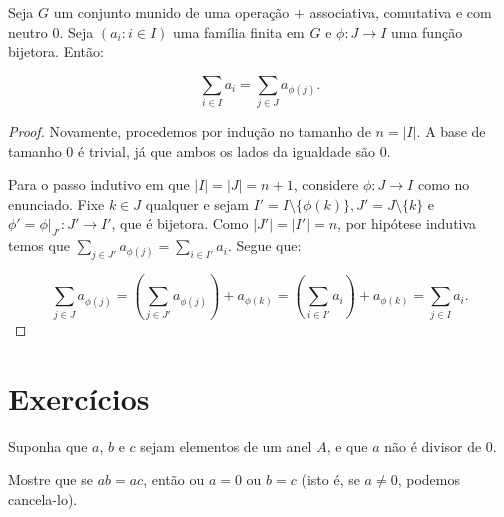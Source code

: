 \begin{prop}
    Seja $G$ um conjunto munido de uma operação $+$ associativa, comutativa e com neutro $0$.
Seja $(a_i: i \in I)$ uma família finita em $G$ e $\phi:J\rightarrow I$ uma função bijetora.
Então:

    \[\sum_{i \in I}a_i=\sum_{j \in J}a_{\phi(j)}.\]

\end{prop}
\begin{proof}
Novamente, procedemos por indução no tamanho de $n=|I|$.
A base de tamanho $0$ é trivial, já que ambos os lados da igualdade são $0$.

Para o passo indutivo em que $|I|=|J|=n+1$, considere $\phi:J\rightarrow I$ como no enunciado.
Fixe $k \in J$ qualquer e sejam $I'=I\setminus\{\phi(k)\}, J'=J\setminus\{k\}$ e $\phi'=\phi|_{J'}:J'\rightarrow I'$, que é bijetora.
Como $|J'|=|I'|=n$, por hipótese indutiva temos que $\sum_{j \in J'}a_{\phi(j)}=\sum_{i \in I'}a_i$.
Segue que:

\[\sum_{j \in J}a_{\phi(j)}=\left(\sum_{j \in J'}a_{\phi(j)}\right)+a_{\phi(k)}=\left(\sum_{i \in I'}a_{i}\right)+a_{\phi(k)}=\sum_{j \in I}a_{i}.\]
\end{proof}

\section{Exercícios}
\begin{exer}
    Suponha que $a$, $b$ e $c$ sejam elementos de um anel $A$, e que $a$ não é divisor de $0$.
    
    Mostre que se $ab = ac$, então ou $a = 0$ ou $b = c$ (isto é, se $a\neq 0$, podemos cancela-lo).
\end{exer}
